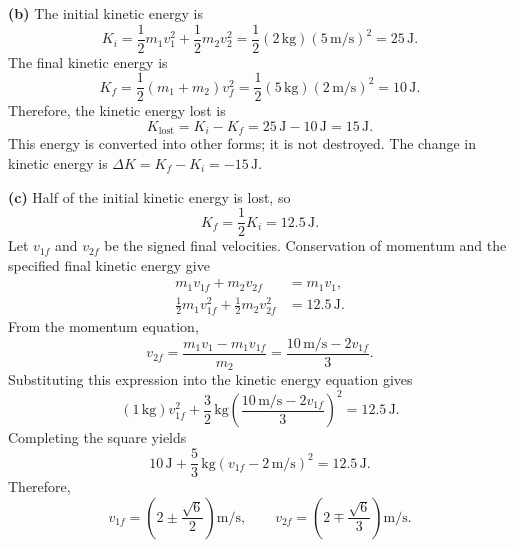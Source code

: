 \documentclass[../main.tex]{subfiles}
\begin{document}
\textbf{(b)}
The initial kinetic energy is
\begin{equation}
    K_i = \frac{1}{2}m_1v_1^2+\frac{1}{2}m_2v_2^2
    = \frac{1}{2}(2\,\mathrm{kg})(5\,\mathrm{m/s})^2
    = 25\,\mathrm{J}.
\end{equation}
The final kinetic energy is
\begin{equation}
    K_f = \frac{1}{2}(m_1+m_2)v_f^2
    = \frac{1}{2}(5\,\mathrm{kg})(2\,\mathrm{m/s})^2
    = 10\,\mathrm{J}.
\end{equation}
Therefore, the kinetic energy lost is
\begin{equation}
    K_{\mathrm{lost}} = K_i-K_f
    = 25\,\mathrm{J}-10\,\mathrm{J}
    = \boxed{15\,\mathrm{J}}.
\end{equation}
This energy is converted into other forms; it is not destroyed.
The change in kinetic energy is
$\Delta K = K_f-K_i=-15\,\mathrm{J}$.

\textbf{(c)}
Half of the initial kinetic energy is lost, so
\begin{equation}
    K_f = \frac{1}{2}K_i = 12.5\,\mathrm{J}.
\end{equation}
Let $v_{1f}$ and $v_{2f}$ be the signed final velocities.
Conservation of momentum and the specified final kinetic energy give
\begin{align}
    m_1v_{1f}+m_2v_{2f} &= m_1v_1,\\
    \frac{1}{2}m_1v_{1f}^2+\frac{1}{2}m_2v_{2f}^2
    &= 12.5\,\mathrm{J}.
\end{align}
From the momentum equation,
\begin{equation}
    v_{2f}
    = \frac{m_1v_1-m_1v_{1f}}{m_2}
    = \frac{10\,\mathrm{m/s}-2v_{1f}}{3}.
\end{equation}
Substituting this expression into the kinetic energy equation gives
\begin{equation}
    (1\,\mathrm{kg})v_{1f}^2
    + \frac{3}{2}\,\mathrm{kg}
    \left(\frac{10\,\mathrm{m/s}-2v_{1f}}{3}\right)^2
    = 12.5\,\mathrm{J}.
\end{equation}
Completing the square yields
\begin{equation}
    10\,\mathrm{J}
    + \frac{5}{3}\,\mathrm{kg}
    \left(v_{1f}-2\,\mathrm{m/s}\right)^2
    = 12.5\,\mathrm{J}.
\end{equation}
Therefore,
\begin{equation}
    v_{1f}
    = \left(2\pm\frac{\sqrt{6}}{2}\right)\mathrm{m/s},
    \qquad
    v_{2f}
    = \left(2\mp\frac{\sqrt{6}}{3}\right)\mathrm{m/s}.
\end{equation}
\end{document}

